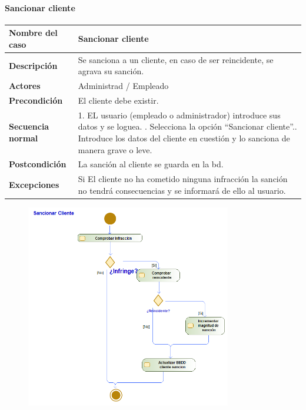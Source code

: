 \paragraph{Sancionar cliente}
\begin{table}[H]
	\centering
	\small
	\begin{tabularx}{0.8\textwidth}{|p{3.5cm}|X|}
		\hline
		\rowcolor{lightgray}
		\textbf{Nombre del caso}  & \textbf{Sancionar cliente}                                                                                            \\
		\hline
		\textbf{Descripción}      & Se sanciona a un cliente, en caso de ser reincidente, se agrava su sanción.                                           \\
		\hline
		\textbf{Actores}          & Administrad / Empleado                                                                                                \\
		\hline
		\textbf{Precondición}     & El cliente debe existir.                                                                                              \\
		\hline
		\textbf{Secuencia normal} & 1. EL usuario (empleado o administrador) introduce sus datos y se loguea. \newline
		2. Selecciona la opción ``Sancionar cliente''.\newline
		3. Introduce los datos del cliente en cuestión y lo sanciona de manera grave o leve.                                                              \\
		\hline
		\textbf{Postcondición}    & La sanción al cliente se guarda en la \gls{bd}.                                                                       \\
		\hline
		\textbf{Excepciones}      & Si El cliente no ha cometido ninguna infracción la sanción no tendrá consecuencias y se informará de ello al usuario. \\
		\hline
	\end{tabularx}
\end{table}
\begin{figure}[H]
	\centering
	\includegraphics[width=0.8\textwidth]{Use_Cases/Sancionar Cliente.png}
\end{figure}
\newpage
